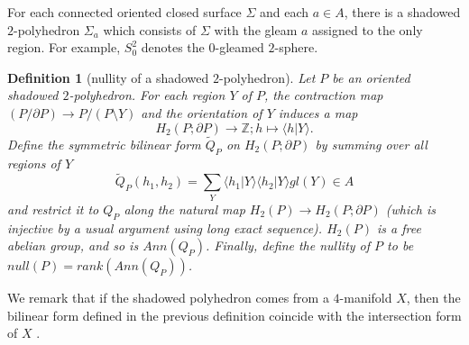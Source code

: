 \documentclass[12pt]{extarticle}
\numberwithin{equation}{section} %
\theoremstyle{mystyle}
\newtheorem{definition}[equation]{Definition}
\begin{document}
\noindent For each connected oriented closed surface $\Sigma$ and
each $a \in A$, there is a shadowed $2$-polyhedron $\Sigma_{a}$
which consists of $\Sigma$ with the gleam $a$ assigned to the
only region. For example, $S^{2}_{0}$ denotes the $0$-gleamed
$2$-sphere.

\begin{definition}[nullity of a shadowed $2$-polyhedron]\label{def/nullity-of-a-shadowed-2-polyhedron}\cite[section VIII.5.1]{turaev-qiok-3-manifolds}
  Let $P$ be an oriented shadowed $2$-polyhedron. For each region
  $Y$ of $P$, the contraction map
  $(P / \partial P) \to P / (P \setminus Y)$ and the orientation
  of $Y$ induces a map
  $$H_{2}(P;\partial P) \to \mathbb{Z}; h \mapsto \langle h | Y \rangle.$$
  Define the symmetric bilinear form $\tilde{Q}_{P}$ on
  $H_{2}(P; \partial P)$ by summing over all regions of $Y$
  $$\tilde{Q}_{P}(h_{1}, h_{2}) = \sum_{Y} \langle h_{1}|Y\rangle \langle h_{2}|Y\rangle gl(Y) \in A$$
  and restrict it to $Q_{P}$ along the natural map
  $H_{2}(P) \to H_{2}(P; \partial P)$ (which is injective by a
  usual argument using long exact sequence). $H_{2}(P)$ is a free
  abelian group, and so is $Ann(Q_{P})$. Finally, define the
  nullity of $P$ to be $null(P) = rank(Ann(Q_{P}))$.
\end{definition}

\noindent We remark that if the shadowed polyhedron comes from a
$4$-manifold $X$, then the bilinear form defined in the previous
definition coincide with the intersection form of $X$
\cite[section IX.5]{turaev-qiok-3-manifolds}.
\end{document}
